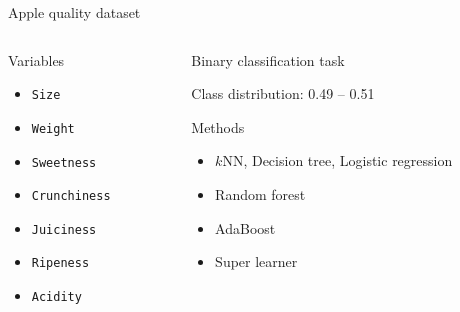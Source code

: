 

\begin{frame}{Apple quality dataset}

\vspace*{-2.5em}\begin{columns}[T]
\begin{column}{0.5\textwidth}
Variables


\begin{itemize}
	\item \texttt{Size}
	\item \texttt{Weight}
	\item \texttt{Sweetness}
	\item \texttt{Crunchiness}
	\item \texttt{Juiciness}
	\item \texttt{Ripeness}
	\item \texttt{Acidity}
\end{itemize}

\end{column}
\hspace*{-2em}%
\begin{column}{0.5\textwidth}
\alert{Binary classification} task%

Class distribution: 0.49 -- 0.51

\vspace{1em}Methods
\begin{itemize}
	\item $k\text{NN}$, Decision tree, Logistic regression
	\item Random forest
	\item AdaBoost
	\item Super learner
\end{itemize}
\end{column}
\end{columns}

\end{frame}


